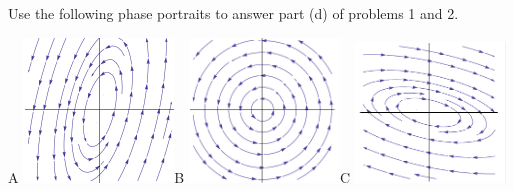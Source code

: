 \documentclass[epsf]{article}
\begin{document}
\newpage

Use the following phase portraits to answer part (d) of problems 1 and 2. \\


\begin{center}
A \includegraphics[width=40mm]{center1.png}\hspace{0.6 cm}B \includegraphics[width=40mm]{center2.png}\hspace{0.6cm}C \includegraphics[width=40mm]{center3.png}\\


\end{center}
\end{document}
